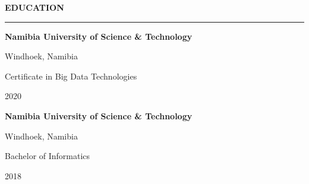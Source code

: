 \documentclass[
  letterpaper,
  DIV=11,
  numbers=noendperiod]{scrartcl}
\begin{document}
\vspace{5pt}

\begin{large}
  {\bf EDUCATION}
  \vspace{3pt}
  \hrule
  \begin{multicols}{2}
    \begin{flushleft}{\bf Namibia University of Science \& Technology}\end{flushleft}
    \begin{flushright}Windhoek, Namibia\end{flushright}
  \end{multicols}
  \vspace{-0.17cm}
  \begin{multicols}{2}
    \begin{flushleft}Certificate in Big Data Technologies\end{flushleft}
    \begin{flushright}2020\end{flushright}
  \end{multicols}
\end{large}

\vspace{0.05cm}

\begin{large}
  \begin{multicols}{2}
    \begin{flushleft}{\bf Namibia University of Science \& Technology}\end{flushleft}
    \begin{flushright}Windhoek, Namibia\end{flushright}
  \end{multicols}
  \vspace{-0.17cm}
  \begin{multicols}{2}
    \begin{flushleft}Bachelor of Informatics\end{flushleft}
    \begin{flushright}2018\end{flushright}
  \end{multicols}
\end{large}

\vspace{1.5pt}
\end{document}
